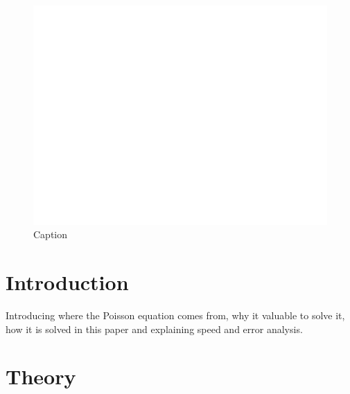 \documentclass[a4paper,11pt, english, twoside]{article}
\begin{document}
\begin{figure}[ht]
  \centering
  \includegraphics[scale=0.5]{figures/function.eps}
  \caption{\label{fig:general} Caption}
\end{figure}

\section{Introduction}
Introducing where the Poisson equation comes from, why it valuable to solve it,
how it is solved in this paper and explaining speed and error analysis.

\section{Theory}
\end{document}
